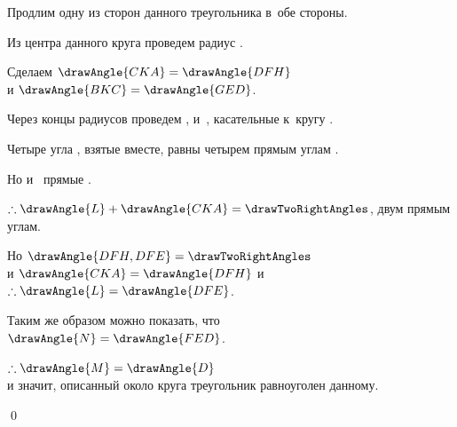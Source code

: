 \documentclass[letters,booklanguage=russian]{byrnebook}
\begin{document}
\begin{center}
Продлим одну из сторон  данного треугольника в~обе стороны.

Из центра данного круга проведем радиус .

Сделаем $\drawAngle{CKA} = \drawAngle{DFH}$ \\
и $\drawAngle{BKC} = \drawAngle{GED}$.

Через концы радиусов проведем ,  и~, касательные к~кругу .

Четыре угла
,
взятые вместе, равны четырем прямым углам .

Но  и~ прямые \byref{\constref}.

$\therefore \drawAngle{L} + \drawAngle{CKA} = \drawTwoRightAngles$, двум прямым углам.

Но $\drawAngle{DFH,DFE} = \drawTwoRightAngles$ \\
и $\drawAngle{CKA} = \drawAngle{DFH}$ \byref{\constref} и~$\therefore \drawAngle{L} = \drawAngle{DFE}$.

Таким же образом можно показать, что\\
$\drawAngle{N} = \drawAngle{FED}$.

$\therefore \drawAngle{M} = \drawAngle{D}$ \\
и значит, описанный около круга треугольник равноуголен данному.
\end{center}

\qed
\end{document}

